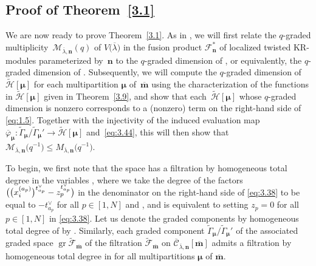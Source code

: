 \documentclass[10pt,a4paper]{amsart}
\numberwithin{equation}{section}
\DeclareMathOperator{\gr}{gr}
\begin{document}
\subsection[Proof of Theorem 3.1]{Proof of Theorem~\ref{3.1}}\label{Section 3.6}

We are now ready to prove Theorem~\ref{3.1}. As in \cite{AK07,AKS06}, we will first relate the $q$-graded multiplicity~$\mathcal{M}_{\overline{\lambda},\mathbf{n}}(q)$ of $V\bigl(\overline{\lambda}\bigr)$ in the fusion product $\mathcal{F}_{\mathbf{n}}^*$ of localized twisted KR-modules parameterized by~$\mathbf{n}$ to the $q$-graded dimension of , or equivalently, the $q$-graded dimension of \smash{$\gr\tilde{\mathcal{F}}_{\overline{ \mathbf{m}}}$}. Subsequently, we will compute the $q$-graded dimension of $\tilde{\mathcal{H}}[\bm{\mu}]$ for each multipartition $\bm{\mu}$ of~$\overline{\mathbf{m}}$ using the characterization of the functions in $\tilde{\mathcal{H}}[\bm{\mu}]$ given in Theorem~\ref{3.9}, and show that each~$\tilde{\mathcal{H}}[\bm{\mu}]$ whose $q$-graded dimension is nonzero corresponds to a (nonzero) term on the right-hand side of \eqref{eq:1.5}. Together with the injectivity of the induced evaluation map $\overline{\varphi}_{\bm{\mu}}\colon\tilde{ \Gamma}_{\bm{\mu}}/\tilde{\Gamma}_{\bm{\mu}}'\to\tilde{ \mathcal{H}}[\bm{\mu}]$ and~\eqref{eq:3.44}, this will then show that $\mathcal{M}_{\overline{\lambda},\mathbf{n}}\bigl(q^{-1}\bigr)\leq M_{\overline{\lambda},\mathbf{n}}\bigl(q^{-1}\bigr)$.

To begin, we first note that the space  has a filtration by homogeneous total degree in the variables , where we take the degree of the factors $\bigl(\smash{\bigl(x_i^{(a_p)}\bigr)^{t_{a_p}^{ \vee}}}\allowbreak-\smash{z_p^{t_{a_p}^{\vee}}}\bigr)$ in the denominator on the right-hand side of \eqref{eq:3.38} to be equal to $-t_{a_p}^{\vee}$ for all $p\in[1,N]$ and , and is equivalent to setting $z_p=0$ for all $p\in[1,N]$ in \eqref{eq:3.38}. Let us denote the graded components by homogeneous total degree of  by . Similarly, each graded component $\tilde{\Gamma}_{\bm{\mu}}/ \tilde{\Gamma}_{\bm{\mu}}'$ of the associated graded space $\gr\tilde{\mathcal{F}}_{\overline{\mathbf{m}}}$ of the filtration $\tilde{\mathcal{F}}_{\overline{\mathbf{m}}}$ on $\overline{\mathcal{C}}_{\overline{\lambda},\mathbf{n}}[\overline{\mathbf{m}}]$ admits a filtration by homogeneous total degree in  for all multipartitions $\bm{\mu}$ of $\overline{\mathbf{m}}$.
\end{document}
